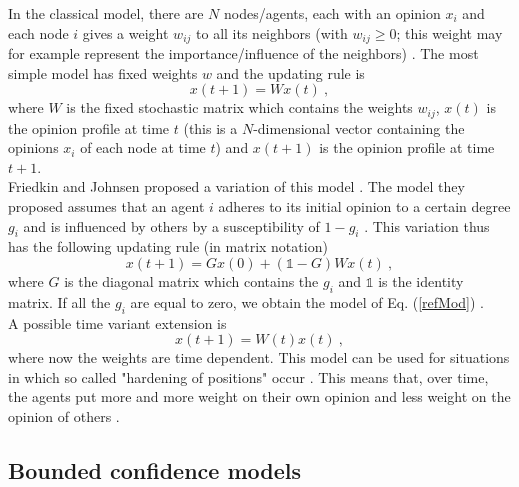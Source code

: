 \documentclass[11 pt , letterpaper , twoside , openright]{book}
\begin{document}
In the classical model, there are $N$ nodes/agents, each with an opinion $x_i$ and each node $i$ gives a weight $w_{ij}$ to all its neighbors (with $w_{ij} \geqslant 0$; this weight may for example represent the importance/influence of the neighbors) \cite{Krause2002}. The most simple model has fixed weights $w$ and the updating rule is \cite{Krause2002}
\begin{equation}\label{refMod}
	x(t+1) = W x(t) \ ,
\end{equation}
where $W$ is the fixed stochastic matrix which contains the weights $w_{ij}$, $x(t)$ is the opinion profile at time $t$ (this is a $N$-dimensional vector containing the opinions $x_i$ of each node at time $t$) and $x(t+1)$ is the opinion profile at time $t+1$.\\
Friedkin and Johnsen proposed a variation of this model \cite{Friedkin1990}\cite{Friedkin1999}. The model they proposed assumes that an agent $i$ adheres to its initial opinion to a certain degree $g_i$ and is influenced by others by a susceptibility of $1-g_i$ \cite{Krause2002}. This variation thus has the following updating rule (in matrix notation) \cite{Krause2002}
\begin{equation}
	x(t+1) = Gx(0) + (\mathbb{1}-G)Wx(t) \ ,
\end{equation}
where $G$ is the diagonal matrix which contains the $g_i$ and $\mathbb{1}$ is the identity matrix. If all the $g_i$ are equal to zero, we obtain the model of Eq. (\ref{refMod}) \cite{Krause2002}.\\
A possible time variant extension is \cite{Krause2002}
\begin{equation}
	x(t+1) = W(t)x(t) \ ,
\end{equation}
where now the weights are time dependent. This model can be used for situations in which so called "hardening of positions" occur \cite{Krause2002}. This means that, over time, the agents put more and more weight on their own opinion and less weight on the opinion of others \cite{Krause2002}. 

\subsection{Bounded confidence models}\label{bounded}
\end{document}
